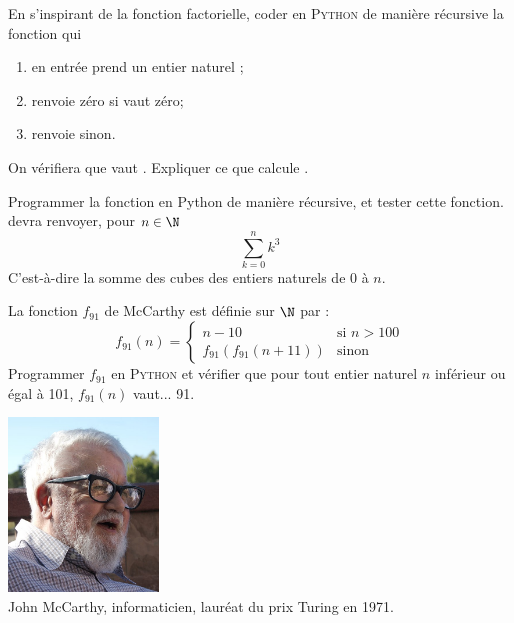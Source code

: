 \documentclass[a4paper,12pt,french]{article}
\begin{document}
\begin{exercice}[]
	En s'inspirant de la fonction factorielle, coder en \textsc{Python} de manière récursive la fonction  qui
	\begin{enumerate}[--]
		\item 	en entrée prend un entier naturel ;
		\item 	renvoie zéro si  vaut zéro;
		\item 	renvoie  sinon.
	\end{enumerate}
	On vérifiera que  vaut . Expliquer ce que calcule .
\end{exercice}

\begin{exercice}
Programmer la fonction  en Python de manière récursive, et tester cette fonction.\\
 devra renvoyer, pour $n\in\N$ $$\sum_{k=0}^nk^3$$ C'est-à-dire la somme des cubes des entiers naturels de 0 à $n$.
\end{exercice}

\begin{exercice}
	\vspace{1em}
	\begin{minipage}{10cm}
	La fonction $f_{91}$ de McCarthy est définie sur $\N$ par :
	$$f_{91}(n)=\begin{cases}
	n-10 & \mbox{si } n>100\\
	f_{91}\left(f_{91}(n+11)\right) &\mbox{sinon}
	\end{cases}$$
	Programmer $f_{91}$ en \textsc{Python} et vérifier que pour tout entier naturel $n$ inférieur ou égal à 101, $f_{91}(n)$ vaut... 91.
	\end{minipage}\hspace{1.5cm}\begin{minipage}{4.2cm}
		\begin{center}
			\includegraphics[width=4cm]{img/mccarthy}\\\scriptsize
			John McCarthy, informaticien, lauréat du prix Turing en 1971.
	\end{center}\end{minipage}\vspace{.5em}
\end{exercice}
\end{document}
